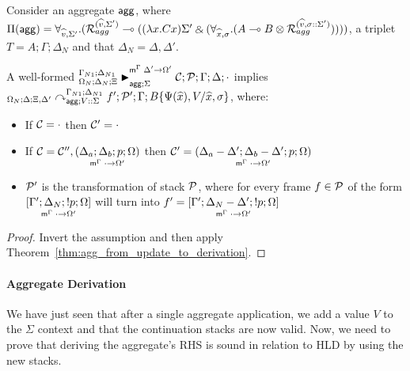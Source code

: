 \begin{corollary}\label{thm:agg_match_to_derivation}
Consider an aggregate $\m{agg}$, where $\Pi(\m{agg}) = \forall_{\widehat{v}, \Sigma'}.
   (\defstwo{agg}{\widehat{v}}{\Sigma'} \lolli ((\lambda x. C x)\Sigma' \with (\forall_{\widehat{x}, \sigma}.
                                                (A \lolli B \otimes
                                                 \defstwo{agg}{\widehat{v}}{\sigma
                                                 ::\Sigma'}))))$,
a triplet $T = A; \Gamma; \Delta_{N}$ and that $\Delta_{N} = \Delta,
  \Delta'$.

A well-formed $\matstatea{\Delta_N}{\lstack{C}; \lstack{P}}{\Gamma}{\Delta}{\cdot}{\Delta' \rightarrow \Omega'}{\Sigma}$
implies
$\derstatea{\Delta}{\Xi, \Delta'}{\Gamma_{N1}}{\Delta_{N1}}{V :: \Sigma}{f';
   \lstack{P'}}{B\{\Psi(\widehat{x}), V / \widehat{x}, \sigma\}}$,
where:
   
\begin{itemize}[leftmargin=*]
   \item If $\lstack{C} = \cdot$ then $\lstack{C'} = \cdot$

   \item If $\lstack{C} = \lstack{C''},
   \lframe{\Delta_a}{\Delta_b}{p}{\Omega}{\cdot}{\Omega'}$
   then $\lstack{C'} = \lframe{\Delta_a - \Delta'}{\Delta_b -
      \Delta'}{p}{\Omega}{\cdot}{\Omega'}$

   \item $\lstack{P'}$ is the transformation of stack $\lstack{P}$, where for every frame $f \in
   \lstack{P}$ of the form $\pframe{\Gamma'}{\Delta_N}{\bang
      p}{\Omega}{\cdot}{\Omega'}$
   will turn into $f' = \pframe{\Gamma'}{\Delta_N-\Delta'}{\bang
      p}{\Omega}{\cdot}{\Omega'}$

\end{itemize}
\end{corollary}

\begin{proof}
Invert the assumption and then apply Theorem~\ref{thm:agg_from_update_to_derivation}.
\end{proof}


\paragraph{Aggregate Derivation}

We have just seen that after a single aggregate application, we add a value $V$
to the $\Sigma$ context and that the continuation stacks are now valid.
Now, we need to prove that deriving the aggregate's RHS
is sound in relation to HLD by using the new stacks.

